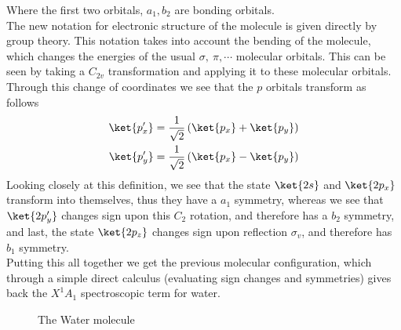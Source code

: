 \documentclass[a4paper, 11pt]{book}
\newcommand{\1}{\opr{\mathds{1}}}
\theoremstyle{plain}
\begin{document}
	Where the first two orbitals, $a_1,b_2$ are bonding orbitals.\\
	The new notation for electronic structure of the molecule is given directly by group theory. This notation takes into account the bending of the molecule, which changes the energies of the usual $\sigma,\ \pi,\cdots$ molecular orbitals. This can be seen by taking a $C_{2v}$ transformation and applying it to these molecular orbitals. Through this change of coordinates we see that the $p$ orbitals transform as follows
	\begin{equation}
		\begin{aligned}
			\ket{p_x'}&=\frac{1}{\sqrt{2}}\left( \ket{p_x}+\ket{p_y} \right)\\
			\ket{p_y'}&=\frac{1}{\sqrt{2}}\left( \ket{p_x}-\ket{p_y} \right)
		\end{aligned}
		\label{eq:c2vh2otransformation}
	\end{equation}
	Looking closely at this definition, we see that the state $\ket{2s}$ and $\ket{2p_x}$ transform into themselves, thus they have a $a_1$ symmetry, whereas we see that $\ket{2p_y'}$ changes sign upon this $C_{2}$ rotation, and therefore has a $b_2$ symmetry, and last, the state $\ket{2p_z}$ changes sign upon reflection $\sigma_v$, and therefore has $b_1$ symmetry.\\
	Putting this all together we get the previous molecular configuration, which through a simple direct calculus (evaluating sign changes and symmetries) gives back the $X^1A_1$ spectroscopic term for water.
	\begin{figure}[H]
		\centering
		\caption{The Water molecule}
		\label{fig:h20}
	\end{figure}
\end{document}
